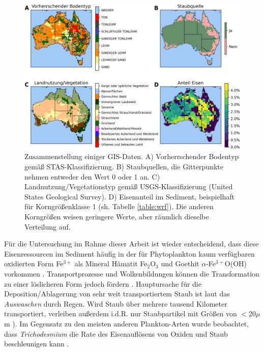 \documentclass[12pt,a4paper,onecolumn,headheight=30pt]{scrartcl}
\begin{document}
\begin{figure}[htbp]
\includegraphics[width=\textwidth]{bilder/soil_type_iron.png}
\caption{Zusammenstellung einiger GIS-Daten. A) Vorherrschender Bodentyp gemäß STAS-Klassifizierung. B) Staubquellen, die Gitterpunkte nehmen entweder den Wert 0 oder 1 an. C) Landnutzung/Vegetationstyp gemäß USGS-Klassifizierung (United States Geological Survey). D) Eisenanteil im Sediment, beispielhaft für Korngrößenklasse 1 (sh. Tabelle \ref{table:wrf}). Die anderen Korngrößen weisen geringere Werte, aber räumlich dieselbe Verteilung auf.} \label{fig:soil_type_iron}
\end{figure}
Für die Untersuchung im Rahme dieser Arbeit ist wieder entscheidend, dass diese Eisenressourcen im Sediment häufig in der für Phytoplankton kaum verfügbaren oxidierten Form Fe$^{3+}$ als Mineral Hämatit Fe$_2$O$_3$ und Goethit $\alpha$-Fe$^{3+}$O(OH) vorkommen \citep{Reynolds.2014}. Transportprozesse und Wolkenbildungen können die Transformation zu einer löslicheren Form jedoch fördern \citep{Shao.2011}. Hauptursache für die Deposition/Ablagerung von sehr weit transportiertem Staub ist laut \citet{Marx.2018} das \textit{Auswaschen} durch Regen. Wird Staub über mehrere tausend Kilometer transportiert, verleiben außerdem  i.d.R. nur Staubpartikel mit Größen von $<$20$\mu$m \citep{Marx.2018}). Im Gegensatz zu den meisten anderen Plankton-Arten wurde beobachtet, dass \textit{Trichodesmium} die Rate des Eisenauflösens von Oxiden und Staub beschleunigen kann \citep{Rubin.2011}.
\end{document}
